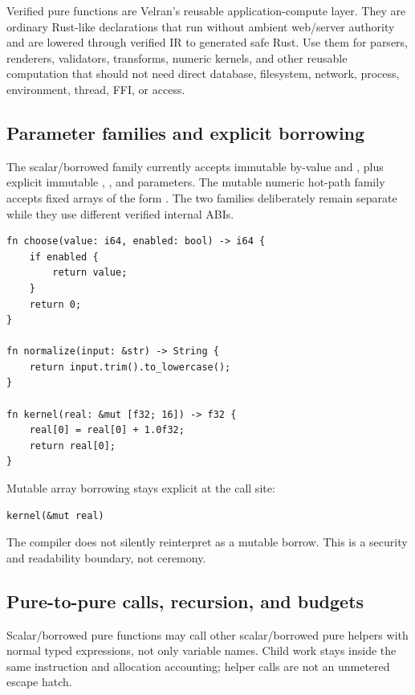 Verified pure functions are Velran's reusable application-compute layer. They are ordinary Rust-like  declarations that run without ambient web/server authority and are lowered through verified IR to generated safe Rust. Use them for parsers, renderers, validators, transforms, numeric kernels, and other reusable computation that should not need direct database, filesystem, network, process, environment, thread, FFI, or  access.

\subsection*{Parameter families and explicit borrowing}

The scalar/borrowed family currently accepts immutable by-value  and , plus explicit immutable , \code{\&[String]}, and  parameters. The mutable numeric hot-path family accepts fixed arrays of the form . The two families deliberately remain separate while they use different verified internal ABIs.

\begin{lstlisting}[language=Velran]
fn choose(value: i64, enabled: bool) -> i64 {
    if enabled {
        return value;
    }
    return 0;
}

fn normalize(input: &str) -> String {
    return input.trim().to_lowercase();
}

fn kernel(real: &mut [f32; 16]) -> f32 {
    real[0] = real[0] + 1.0f32;
    return real[0];
}
\end{lstlisting}

Mutable array borrowing stays explicit at the call site:

\begin{lstlisting}[language=Velran]
kernel(&mut real)
\end{lstlisting}

The compiler does not silently reinterpret  as a mutable borrow. This is a security and readability boundary, not ceremony.

\subsection*{Pure-to-pure calls, recursion, and budgets}

Scalar/borrowed pure functions may call other scalar/borrowed pure helpers with normal typed expressions, not only variable names. Child work stays inside the same instruction and allocation accounting; helper calls are not an unmetered escape hatch.

